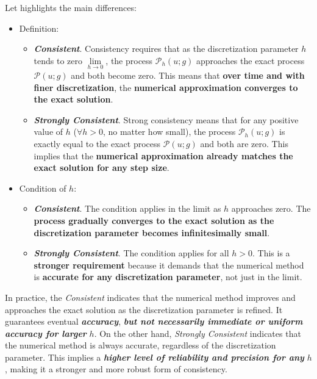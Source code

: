 \highspace
Let highlights the main differences:
\begin{itemize}
    \item Definition:
    \begin{itemize}
        \item \textcolor{Green4}{\emph{\textbf{Consistent}}}. Consistency requires that as the discretization parameter \( h \) tends to zero $\lim\limits_{h \rightarrow 0}$, the process \( \mathcal{P}_{h}(u; g) \) approaches the exact process \( \mathcal{P}(u; g) \) and both become zero. This means that \textbf{over time and with finer discretization}, the \textbf{numerical approximation converges to the exact solution}.

        \item \textcolor{Green4}{\emph{\textbf{Strongly Consistent}}}. Strong consistency means that for any positive value of \( h \) ($\forall h > 0$, no matter how small), the process \( \mathcal{P}_{h}(u; g) \) is exactly equal to the exact process \( \mathcal{P}(u; g) \) and both are zero. This implies that the \textbf{numerical approximation already matches the exact solution for any step size}.
    \end{itemize}

    \item Condition of $h$:
    \begin{itemize}
        \item \textcolor{Green4}{\emph{\textbf{Consistent}}}. The condition applies in the limit as \( h \) approaches zero. The \textbf{process gradually converges to the exact solution as the discretization parameter becomes infinitesimally small}.

        \item \textcolor{Green4}{\emph{\textbf{Strongly Consistent}}}. The condition applies for all \( h > 0 \). This is a \textbf{stronger requirement} because it demands that the numerical method is \textbf{accurate for any discretization parameter}, not just in the limit.
    \end{itemize}
\end{itemize}
In practice, the \emph{Consistent} indicates that the numerical method improves and approaches the exact solution as the discretization parameter is refined. It guarantees eventual \emph{\textbf{accuracy}}, \emph{\textbf{but not necessarily immediate or uniform accuracy for larger}} \( h \). On the other hand, \emph{Strongly Consistent} indicates that the numerical method is always accurate, regardless of the discretization parameter. This implies a \emph{\textbf{higher level of reliability and precision for any}} \( h \), making it a stronger and more robust form of consistency.

